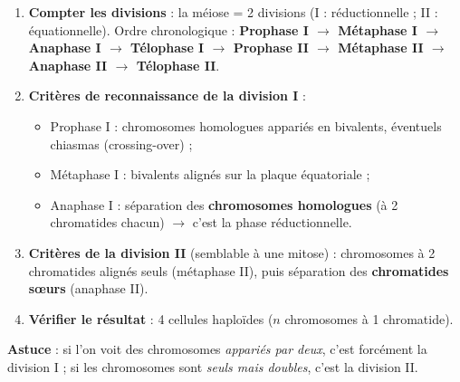 \documentclass[11pt]{article}
\newcommand{\cle}[1]{{\popxbold\color{popdark}#1}}
\begin{document}
\begin{methode}
\begin{enumerate}
\item \textbf{Compter les divisions} : la méiose = 2 divisions (I : réductionnelle ; II : équationnelle). Ordre chronologique : \textbf{Prophase I $\rightarrow$ Métaphase I $\rightarrow$ Anaphase I $\rightarrow$ Télophase I $\rightarrow$ Prophase II $\rightarrow$ Métaphase II $\rightarrow$ Anaphase II $\rightarrow$ Télophase II}.
\item \textbf{Critères de reconnaissance de la division I} :
\begin{itemize}
\item Prophase I : chromosomes homologues appariés en \cle{bivalents}, éventuels chiasmas (crossing-over) ;
\item Métaphase I : bivalents alignés sur la plaque équatoriale ;
\item Anaphase I : séparation des \textbf{chromosomes homologues} (à 2 chromatides chacun) $\rightarrow$ c'est la phase réductionnelle.
\end{itemize}
\item \textbf{Critères de la division II} (semblable à une mitose) : chromosomes à 2 chromatides alignés seuls (métaphase II), puis séparation des \textbf{chromatides sœurs} (anaphase II).
\item \textbf{Vérifier le résultat} : 4 cellules haploïdes ($n$ chromosomes à 1 chromatide).
\end{enumerate}
\textbf{Astuce} : si l'on voit des chromosomes \emph{appariés par deux}, c'est forcément la division I ; si les chromosomes sont \emph{seuls mais doubles}, c'est la division II.
\end{methode}
\end{document}
